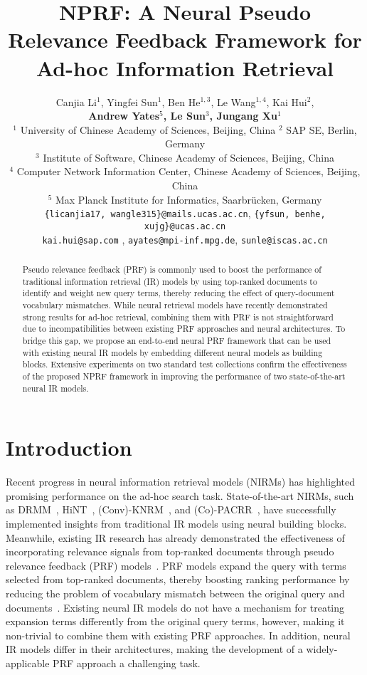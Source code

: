 \documentclass[11pt,a4paper]{article}
\title{NPRF: A Neural Pseudo Relevance Feedback Framework for Ad-hoc Information Retrieval}
\author{Canjia Li$^1$, Yingfei Sun$^1$, Ben He$^{1,3}$\textsuperscript{\Letter}, Le Wang$^{1,4}$, Kai Hui$^2$,\\ 
	\textbf{Andrew Yates$^5$, Le Sun$^{3}$, Jungang Xu$^1$} \\
	$^{1}$ University of Chinese Academy of Sciences, Beijing, China \hspace{0.1cm} $^{2}$ SAP SE, Berlin, Germany\\ 
	$^{3}$ Institute of Software, Chinese Academy of Sciences, Beijing, China\\
    $^{4}$ Computer Network Information Center, Chinese Academy of Sciences, Beijing, China\\
    $^5$ Max Planck Institute for Informatics, Saarbr\"ucken, Germany \\
\small {\tt \{licanjia17, wangle315\}@mails.ucas.ac.cn}, \hspace{0.15cm}  {\tt \{yfsun, benhe\textsuperscript{\Letter}, xujg\}@ucas.ac.cn}  \\ 
\small  {\tt kai.hui@sap.com} , \hspace{0.15cm} {\tt ayates@mpi-inf.mpg.de}, \hspace{0.15cm} {\tt sunle@iscas.ac.cn}
}
\begin{document}
\maketitle
\begin{abstract}
Pseudo relevance feedback (PRF) is commonly used to boost the performance of traditional information retrieval (IR) models by using top-ranked documents to identify and weight new query terms, thereby reducing the effect of query-document vocabulary mismatches. While neural retrieval models have recently demonstrated strong results for ad-hoc retrieval, combining them with PRF is not straightforward due to incompatibilities between existing PRF approaches and neural architectures. To bridge this gap, we propose an end-to-end neural PRF framework that can be used with existing neural IR models by embedding different neural models as building blocks. Extensive experiments on two standard test collections confirm the effectiveness of the proposed NPRF framework in improving the performance of two state-of-the-art neural IR models.
\end{abstract}

\def \vignore {0mm}

\vspace{\vignore}
\section{Introduction}\label{sec:Introduction}
\vspace{\vignore}

Recent progress in neural information retrieval models (NIRMs) has highlighted promising performance
on the ad-hoc search task. State-of-the-art NIRMs, such as DRMM~\cite{DBLP:conf/cikm/GuoFAC16}, HiNT~\cite{DBLP:conf/sigir/FanGLXZC18},
(Conv)-KNRM~\cite{DBLP:conf/sigir/XiongDCLP17,DBLP:conf/wsdm/DaiXC018},
and (Co)-PACRR~\cite{DBLP:conf/emnlp/HuiYBM17,DBLP:conf/wsdm/HuiYBM18}, 
have successfully implemented insights from  traditional IR models using  
neural building blocks.
Meanwhile, 
existing IR research has already demonstrated the effectiveness of 
incorporating relevance signals from top-ranked documents through 
pseudo relevance feedback (PRF) models~\cite{buckley08rfoverview,DBLP:conf/acl/0001MC16}.
PRF models expand the query with terms selected from top-ranked documents, thereby
boosting ranking performance by reducing the problem of vocabulary mismatch between the original query and documents~\cite{rocchio1971relevance}.
Existing neural IR models do not have a mechanism for treating expansion terms differently from the original query terms, however, making it non-trivial to combine them with existing PRF approaches.
In addition, 
neural IR models differ in their architectures, 
making the development of 
a widely-applicable PRF approach a challenging task.
\end{document}
